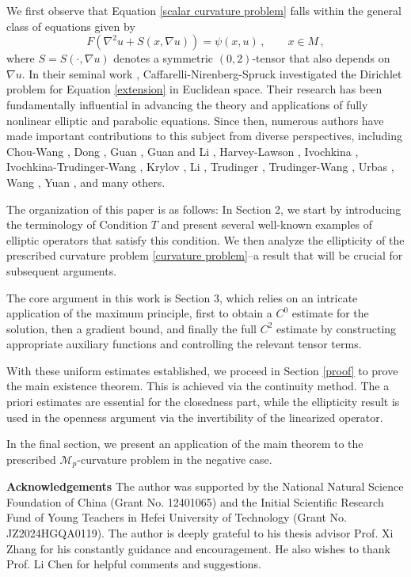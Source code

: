 \documentclass{article}
\theoremstyle{plain}
\theoremstyle{definition}
\theoremstyle{definition}
\numberwithin{equation}{section}
\begin{document}
\begin{sloppypar}
We first observe that Equation \eqref{scalar curvature problem} falls within the general class of equations given by
\begin{equation}\label{extension}
F(\nabla^2u+S(x,\nabla u))=\psi(x,u)\,, \qquad x\in M\,,
\end{equation}
where $S = S(\cdot,\nabla u)$ denotes a symmetric $(0,2)$-tensor that also depends on $\nabla u$. In their seminal work \cite{CNS85}, Caffarelli-Nirenberg-Spruck investigated the Dirichlet problem for Equation \eqref{extension} in Euclidean space. Their research has been fundamentally influential in advancing the theory and applications of fully nonlinear elliptic and parabolic equations. Since then, numerous authors have made important contributions to this subject from diverse perspectives, including Chou-Wang \cite{CW}, Dong \cite{Dong06}, Guan \cite{Guan94,Guan99,Guan12}, Guan and Li \cite{GL96}, Harvey-Lawson \cite{HL09,HL11}, Ivochkina \cite{Iv91}, Ivochkina-Trudinger-Wang \cite{ITW04},  Krylov \cite{Kry83,Kry95,Kry97}, Li \cite{Li90}, Trudinger \cite{Tru95}, Trudinger-Wang \cite{TW99}, Urbas \cite{Urbas}, Wang \cite{W94}, Yuan \cite{Yuan01}, and many others. \medskip



   
The organization of this paper is as follows: In Section 2, we start by introducing the terminology of Condition $T$ and present several well-known examples of elliptic operators that satisfy this condition. We then analyze the ellipticity of the prescribed curvature problem \eqref{curvature problem}--a result that will be crucial for subsequent arguments.

The core argument in this work is Section 3, which relies on an intricate application of the maximum principle, first to obtain a $C^0$ estimate for the solution, then a gradient bound, and finally the full $C^2$ estimate by constructing appropriate auxiliary functions and controlling the relevant tensor terms.

With these uniform estimates established, we proceed in Section \ref{proof} to prove the main existence theorem. This is achieved via the continuity method. The a priori estimates are essential for the closedness part, while the ellipticity result is used in the openness argument via the invertibility of the linearized operator. 

In the final section, we present an application of the main theorem to the prescribed $\mathcal{M}_p$-curvature problem in the negative case.
\medskip

\noindent\textbf{Acknowledgements}
The author was supported by the National Natural Science Foundation of China (Grant No. 12401065) and the Initial Scientific Research Fund of Young Teachers in Hefei University of Technology (Grant No. JZ2024HGQA0119). The author is deeply grateful to his thesis advisor Prof. Xi Zhang for his constantly guidance and encouragement. He also wishes to thank Prof. Li Chen for helpful comments and suggestions. %
\medskip


\end{sloppypar}
\end{document}

